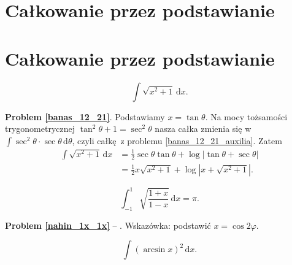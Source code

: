 \section{Całkowanie przez podstawianie}
\section{Całkowanie przez podstawianie} %


\begin{multicols}{2}
\begin{problem}
    \label{banas_12_21}%
    \begin{equation}
        \int \sqrt{x^2 + 1} \, \mathrm{d}x.
    \end{equation}
\end{problem}

\textbf{Problem \ref{banas_12_21}}. %
Podstawiamy $x = \tan \theta$. %
Na mocy tożsamości trygonometrycznej $\tan^2 \theta + 1 = \sec^2 \theta$ nasza całka zmienia się w $\int \sec^2 \theta \cdot \sec \theta \,\mathrm{d}\theta$, czyli całkę z problemu \ref{banas_12_21_auxilia}. %
Zatem %
\begin{align} %
    \int \sqrt{x^2 + 1} \, \mathrm{d}x & = \frac 12 \sec \theta \tan \theta + \log |\tan \theta + \sec \theta| \\ %
    & = \frac 1 2 x \sqrt{x^2 + 1} + \log \left|x + \sqrt{x^2+1}\right|. %
\end{align} %

\begin{problem}
    \label{nahin_1x_1x}%
    \begin{equation}
        \int_{-1}^1 \sqrt{\frac{1+x}{1-x}} \,\mathrm{d}x = \pi.
    \end{equation}
\end{problem}

\textbf{Problem \ref{nahin_1x_1x}} -- \cite[s. 115, 378]{nahin15}. %
Wskazówka: podstawić $x = \cos 2 \varphi$. %


\begin{problem}
    \label{banas_12_18}%
    \begin{equation}
        \int (\arcsin x)^2 \,\mathrm{d}x.
    \end{equation}
\end{problem}


\end{multicols}
